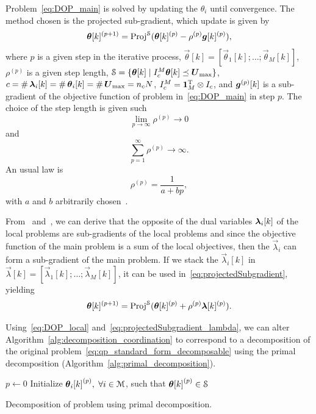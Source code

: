 \documentclass[../main.tex]{subfiles}
\begin{document}
Problem~\eqref{eq:DOP_main} is solved by updating the $\theta_{i}$ until convergence. The method chosen is the projected sub-gradient, which update is given by
\begin{equation}
  \label{eq:projectedSubgradient}
\boldsymbol{\theta}[k]^{(p+1)}=\operatorname{Proj}^{\mathcal{S}}(\boldsymbol{\theta}[k]^{(p)}-\rho^{(p)}\boldsymbol{g}[k]^{(p)}),
\end{equation}
where $p$ is a given step in the iterative process, $\vec{\theta}[k]=[\vec{\theta}_{1}[k];\dots;\vec{\theta}_{M}[k]]$,
$\rho^{(p)}$ is a given step length,
${\mathcal{S} = \{\boldsymbol{\theta}[k]\mid I_{c}^{M}\boldsymbol{\theta}[k]\preceq \boldsymbol{U}_{\max}\}}$,
${c=\card{\lambdaik}=\card{\thetaik}=\card{\vec{U}_{\max}}=n_{c}\predhorz}$,
${I_{c}^{M}=\mathbf{1}_{M}^{\mathrm{T}}\otimes I_{c}}$,
and
$\boldsymbol{g}^{(p)}[k]$ is a sub-gradient of the objective function of problem in~\eqref{eq:DOP_main} in step $p$.
The choice of the step length is given such
\[\lim_{p\to\infty}\rho^{(p)}\to0\]
and
\[\sum_{p=1}^{\infty}\rho^{(p)}\to\infty.\]
An usual law is
\begin{equation}
  \label{eq:rho_update}
  \rho^{(p)}=\frac{1}{a+bp},
\end{equation}
with $a$ and $b$ arbitrarily chosen~\cite{ConejoEtAl2006}.

From~\cite{BoydVandenberghe2004} and~\cite{BoydEtAl2015}, we can derive that the opposite of the dual variables $\lambdaik$ of the local problems are sub-gradients of the local problems and since the objective function of the main problem is a sum of the local objectives, then the $\vec{\lambda}_{i}$ can form a sub-gradient of the main problem.
If we stack the $\vec{\lambda}_{i}[k]$ in $\vec{\lambda}[k]=[\vec{\lambda}_{1}[k];\dots;\vec{\lambda}_{M}[k]]$, it can be used in~\eqref{eq:projectedSubgradient}, yielding
\begin{equation}
  \label{eq:projectedSubgradient_lambda}
  \boldsymbol{\theta}[k]^{(p+1)}=\operatorname{Proj}^{\mathcal{S}}(\boldsymbol{\theta}[k]^{(p)}+\rho^{(p)}\boldsymbol{\lambda}[k]^{(p)}).
\end{equation}

Using~\eqref{eq:DOP_local} and~\eqref{eq:projectedSubgradient_lambda}, we can alter Algorithm~\ref{alg:decomposition_coordination} to correspond to a decomposition of the original \mpc{} problem~\eqref{eq:qp_standard_form_decomposable} using the primal decomposition (Algorithm~\ref{alg:primal_decomposition}).
\begin{algorithm2e}[h]
  \DontPrintSemicolon%
  $p\gets 0$\;
  Initialize ${\thetaik}^{(p)},$ $\forall i\in\mathcal{M}$, such that ${\boldsymbol{\theta}[k]}^{(p)}\in\mathcal{S}$\;
  \caption{Decomposition of \mpc{} problem using primal decomposition.}\label{alg:primal_decomposition}
\end{algorithm2e}
\end{document}
